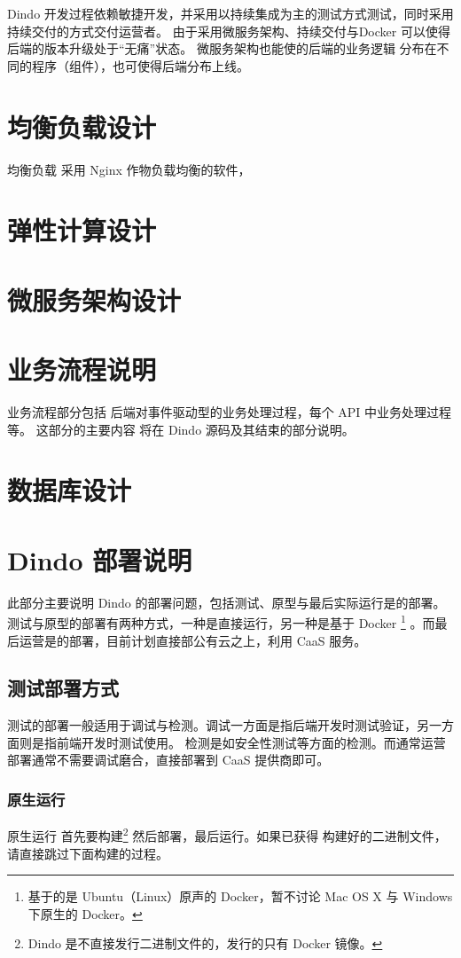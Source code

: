 \documentclass{dingo}
\begin{document}
		Dindo 开发过程依赖敏捷开发，并采用以持续集成为主的测试方式测试，同时采用持续交付的方式交付运营者。
		由于采用微服务架构、持续交付与Docker 可以使得后端的版本升级处于“无痛”状态。 微服务架构也能使的后端的业务逻辑
		分布在不同的程序（组件），也可使得后端分布上线。
    \section{均衡负载设计}
    均衡负载 采用 Nginx 作物负载均衡的软件，
    \section{弹性计算设计}
    \section{微服务架构设计}
    \section{业务流程说明}
    业务流程部分包括 后端对事件驱动型的业务处理过程，每个 API 中业务处理过程等。
    这部分的主要内容 将在 Dindo 源码及其结束的部分说明。
    \section{数据库设计}

  	\section{Dindo 部署说明}
		\label{sec:deploy}
			此部分主要说明 Dindo 的部署问题，包括测试、原型与最后实际运行是的部署。
			测试与原型的部署有两种方式，一种是直接运行，另一种是基于 Docker
			\footnote{基于的是 Ubuntu（Linux）原声的 Docker，暂不讨论 Mac OS X 与 Windows 下原生的 Docker。}
			。而最后运营是的部署，目前计划直接部公有云之上，利用 CaaS 服务。

			\subsection{测试部署方式}
			\label{sub:testdeploy}
				测试的部署一般适用于调试与检测。调试一方面是指后端开发时测试验证，另一方面则是指前端开发时测试使用。
				检测是如安全性测试等方面的检测。而通常运营部署通常不需要调试磨合，直接部署到 CaaS 提供商即可。

				\subsubsection{原生运行}
				\label{subs:nativetest}
					原生运行 首先要构建\footnote{Dindo 是不直接发行二进制文件的，发行的只有 Docker 镜像。}
					然后部署，最后运行。如果已获得 构建好的二进制文件，请直接跳过下面构建的过程。
\end{document}

